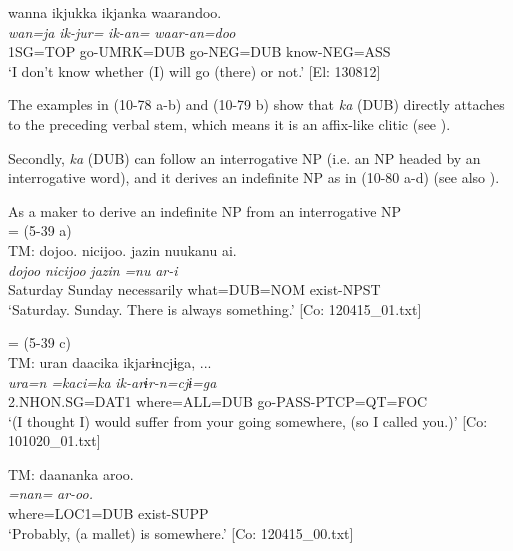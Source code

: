   \ex  %
      \glll    wanna  ikjukka  ikjanka  waarandoo.\\
      \textit{wan=ja}  \textit{ik-jur=}  \textit{ik-an=}  \textit{waar-an=doo}\\
      1SG=TOP  go-UMRK=DUB  go-NEG=DUB  know-NEG=ASS\\
      \glt       ‘I don’t know whether (I) will go (there) or not.’ [El: 130812]
    \z
\z

The examples in (10-78 a-b) and (10-79 b) show that \textit{ka} (DUB) directly attaches to the preceding verbal stem, which means it is an affix-like clitic (see ).

  Secondly, \textit{ka} (DUB) can follow an interrogative NP (i.e. an NP headed by an interrogative word), and it derives an indefinite NP as in (10-80 a-d) (see also ).

\ea\label{ex:10.80}   As a maker to derive an indefinite NP from an interrogative NP\\
   \ea{} = (5-39 a)\\
    TM:
      \glll    {\textbar}dojoo{\textbar}.  {\textbar}nicijoo{\textbar}.  jazin  nuukanu  ai.\\
      \textit{dojoo}  \textit{nicijoo}  \textit{jazin}  \textit{=nu}  \textit{ar-i}\\
      Saturday  Sunday  necessarily  what=DUB=NOM  exist-NPST\\
      \glt       ‘Saturday. Sunday. There is always something.’ [Co: 120415\_01.txt]

  \ex{} = (5-39 c)\\
    TM:
      \glll    uran  daacika  ikjarɨncjɨga, ...\\
      \textit{ura=n}  \textit{=kaci=ka}  \textit{ik-arɨr-n=cjɨ=ga}\\
      2.NHON.SG=DAT1  where=ALL=DUB  go-PASS-PTCP=QT=FOC\\
      \glt       ‘(I thought I) would suffer from your going somewhere, (so I called you.)’ [Co: 101020\_01.txt]

  \ex  TM:
      \glll    daananka  aroo.\\
      \textit{=nan=}  \textit{ar-oo.}\\
      where=LOC1=DUB  exist-SUPP\\
      \glt       ‘Probably, (a mallet) is somewhere.’ [Co: 120415\_00.txt]

